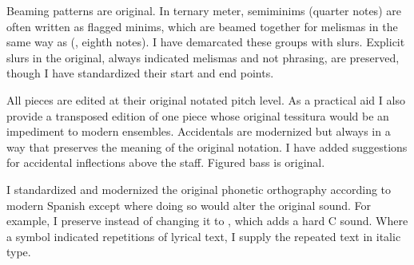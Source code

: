 Beaming patterns are original.
In ternary meter, semiminims (quarter notes) are often written as flagged
minims, which are beamed together for melismas in the same way as
 (, eighth notes).
I have demarcated these groups with slurs.
Explicit slurs in the original, always indicated melismas and not phrasing,
are preserved, though I have standardized their start and end points.

All pieces are edited at their original notated pitch level.
As a practical aid I also provide a transposed edition of one piece whose
original tessitura would be an impediment to modern ensembles.
Accidentals are modernized but always in a way that preserves the meaning of
the original notation.
I have added suggestions for  accidental inflections above
the staff.
Figured bass is original.

I standardized and modernized the original phonetic orthography according to
modern Spanish except where doing so would alter the original sound.
For example, I preserve  instead of changing it to
, which adds a hard C sound.
Where a symbol indicated repetitions of lyrical text, I supply the repeated
text in italic type.

\endinput




